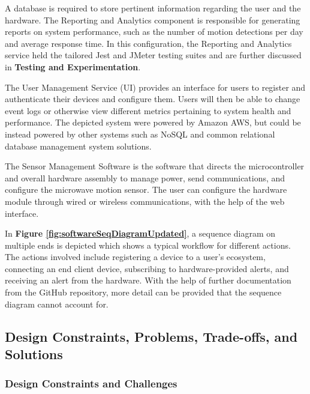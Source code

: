 A database is required to store pertinent information regarding the user and the hardware. The
Reporting and Analytics component is responsible for generating reports on system performance,
such as the number of motion detections per day and average response time. In this
configuration, the Reporting and Analytics service held the tailored Jest and JMeter testing
suites and are further discussed in \textbf{Testing and Experimentation}.



The User Management Service (UI) provides an interface for users to register and
authenticate their devices and configure them. Users will then be able to change event logs or
otherwise view different metrics pertaining to system health and performance. The depicted
system were powered by Amazon AWS, but could be instead powered by other systems such as NoSQL
and common relational database management system solutions.

The Sensor Management Software is the software that directs the microcontroller and overall
hardware assembly to manage power, send communications, and configure the microwave motion
sensor. The user can configure the hardware module through wired or wireless communications,
with the help of the web interface.



In \textbf{Figure \ref{fig:softwareSeqDiagramUpdated}}, a sequence diagram on multiple ends is
depicted which shows a typical workflow for different actions. The actions involved include
registering a device to a user's ecosystem, connecting an end client device, subscribing to
hardware-provided alerts, and receiving an alert from the hardware. With the help of further
documentation from the GitHub repository, more detail can be provided that the sequence
diagram cannot account for.\cite{MorteSense-2023}

\subsection{Design Constraints, Problems, Trade-offs, and Solutions}\label{subsec:design-constraints-problems-trade-offs-and-solutions}

\subsubsection{Design Constraints and Challenges}

